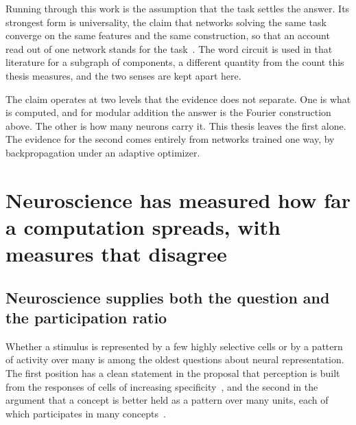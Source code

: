 Running through this work is the assumption that the task settles the answer.
Its strongest form is universality, the claim that networks solving the same
task converge on the same features and the same construction, so that an
account read out of one network stands for the
task~\cite{chughtai_toy_2023, olah_zoom_2020}. The word circuit is used in that
literature for a subgraph of components, a different quantity from the count
this thesis measures, and the two senses are kept apart here.

The claim operates at two levels that the evidence does not separate. One is
what is computed, and for modular addition the answer is the Fourier
construction above. The other is how many neurons carry it. This thesis
leaves the first alone. The evidence for the second comes entirely from
networks trained one way, by backpropagation under an adaptive optimizer.


\section{Neuroscience has measured how far a computation spreads, with measures that disagree}
\label{sec:bg_coding}

\subsection{Neuroscience supplies both the question and the participation ratio}
\label{sec:bg_sparsedistributed}

Whether a stimulus is represented by a few highly selective cells or by a
pattern of activity over many is among the oldest questions about neural
representation. The first position has a clean statement in the proposal that
perception is built from the responses of cells of increasing
specificity~\cite{barlow_single_1972}, and the second in the argument that a
concept is better held as a pattern over many units, each of which
participates in many concepts~\cite{hinton_distributed_1986}.

